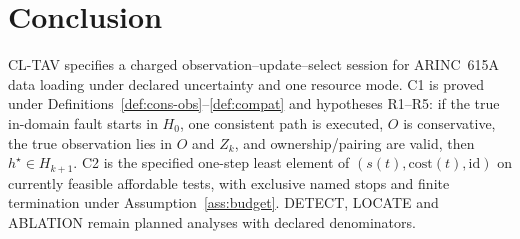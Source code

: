 \section{Conclusion}
\label{sec:concl}

CL-TAV specifies a charged observation--update--select session for ARINC~615A
data loading under declared uncertainty and one resource mode. C1 is proved
under Definitions~\ref{def:cons-obs}--\ref{def:compat} and hypotheses R1--R5:
if the true in-domain fault starts in \(H_0\), one consistent path is
executed, \(O\) is conservative, the true observation lies in \(O\) and
\(Z_k\), and ownership/pairing are valid, then \(h^{\star}\in H_{k+1}\). C2 is
the specified one-step least element of \((s(t),\mathrm{cost}(t),\mathrm{id})\)
on currently feasible affordable tests, with exclusive named stops and finite
termination under Assumption~\ref{ass:budget}. DETECT, LOCATE and ABLATION
remain planned analyses with declared denominators.
